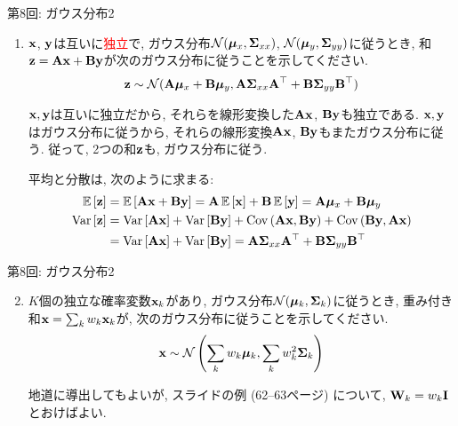 \documentclass[dvipdfmx,notheorems,t]{beamer}
\begin{document}
\begin{frame}{第8回: ガウス分布2}
\begin{enumerate}
  \item $\vb{x}$, $\vb{y}$は互いに\textcolor{red}{独立}で,
  ガウス分布$\mathcal{N}(\vb*{\mu}_x, \vb{\Sigma}_{xx})$,
  $\mathcal{N}(\vb*{\mu}_y, \vb{\Sigma}_{yy})$に従うとき,
  和$\vb{z} = \vb{A} \vb{x} + \vb{B} \vb{y}$が次のガウス分布に従うことを示してください.
  \begin{align*}
    \vb{z} \sim \mathcal{N}(\vb{A} \vb*{\mu}_x + \vb{B} \vb*{\mu}_y,
      \vb{A} \vb{\Sigma}_{xx} \vb{A}^\top + \vb{B} \vb{\Sigma}_{yy} \vb{B}^\top)
  \end{align*}

  $\vb{x}, \vb{y}$は互いに独立だから, それらを線形変換した$\vb{A} \vb{x}$, $\vb{B} \vb{y}$も独立である.
  $\vb{x}, \vb{y}$はガウス分布に従うから, それらの線形変換$\vb{A} \vb{x}$, $\vb{B} \vb{y}$もまたガウス分布に従う.
  従って, 2つの和$\vb{z}$も, ガウス分布に従う.

  平均と分散は, 次のように求まる:
  \begin{align*}
    \operatorname{\mathbb{E}} \left[ \vb{z} \right] &= \operatorname{\mathbb{E}} \left[ \vb{A} \vb{x} + \vb{B} \vb{y} \right]
      = \vb{A} \operatorname{\mathbb{E}} \left[ \vb{x} \right] + \vb{B} \operatorname{\mathbb{E}} \left[ \vb{y} \right]
      = \vb{A} \vb*{\mu}_x + \vb{B} \vb*{\mu}_y \\
    \operatorname{Var} \left[ \vb{z} \right] &= \operatorname{Var} \left[ \vb{A} \vb{x} \right] + \operatorname{Var} \left[ \vb{B} \vb{y} \right]
      + \operatorname{Cov} \left( \vb{A} \vb{x}, \vb{B} \vb{y} \right) + \operatorname{Cov} \left( \vb{B} \vb{y}, \vb{A} \vb{x} \right) \\
      &= \operatorname{Var} \left[ \vb{A} \vb{x} \right] + \operatorname{Var} \left[ \vb{B} \vb{y} \right]
      = \vb{A} \vb{\Sigma}_{xx} \vb{A}^\top + \vb{B} \vb{\Sigma}_{yy} \vb{B}^\top
  \end{align*}
\end{enumerate}
\end{frame}

\begin{frame}{第8回: ガウス分布2}
\begin{enumerate}
  \setcounter{enumi}{1}
  \item $K$個の独立な確率変数$\vb{x}_k$があり, ガウス分布$\mathcal{N}(\vb*{\mu}_k, \vb{\Sigma}_k)$に従うとき,
  重み付き和$\vb{x} = \sum_k w_k \vb{x}_k$が, 次のガウス分布に従うことを示してください.
  \begin{align*}
    \vb{x} \sim \mathcal{N} \left( \sum_k w_k \vb*{\mu}_k, \sum_k w_k^2 \vb{\Sigma}_k \right)
  \end{align*}

  地道に導出してもよいが, スライドの例 (62--63ページ) について, $\vb{W}_k = w_k \vb{I}$とおけばよい.
\end{enumerate}
\end{frame}
\end{document}
